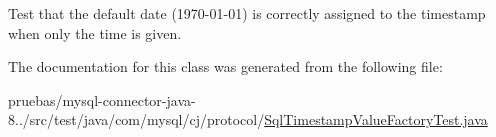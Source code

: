 Test that the default date (1970-\/01-\/01) is correctly assigned to the timestamp when only the time is given. 

The documentation for this class was generated from the following file\+:\begin{DoxyCompactItemize}
\item 
pruebas/mysql-\/connector-\/java-\/8../src/test/java/com/mysql/cj/protocol/\mbox{\hyperlink{_sql_timestamp_value_factory_test_8java}{Sql\+Timestamp\+Value\+Factory\+Test.\+java}}\end{DoxyCompactItemize}
